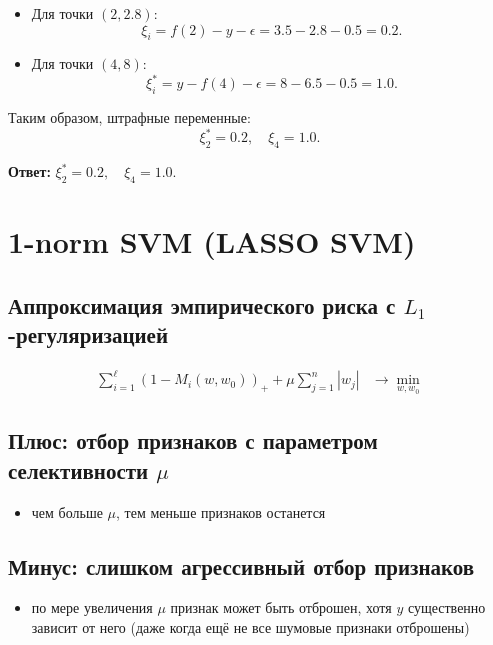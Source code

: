 \begin{enumerate}
\begin{itemize}
              \item Для точки \((2, 2.8)\):
                    \begin{equation*}
                        \xi_i = f(2) - y - \epsilon = 3.5 - 2.8 - 0.5 = 0.2.
                    \end{equation*}
              \item Для точки \((4, 8)\):
                    \begin{equation*}
                        \xi_i^* = y - f(4) - \epsilon = 8 - 6.5 - 0.5 = 1.0.
                    \end{equation*}
          \end{itemize}
          Таким образом, штрафные переменные:
          \begin{equation*}
              \xi_2^* = 0.2, \quad \xi_4 = 1.0.
          \end{equation*}
\end{enumerate}
\par \noindent \textbf{Ответ:} \(\xi_2^* = 0.2, \quad \xi_4 = 1.0.\)


\setcounter{secnumdepth}{0}

\section{1-norm SVM (LASSO SVM)}
\subsection*{Аппроксимация эмпирического риска с \(L_1\)-регуляризацией}
\begin{align*}
    \sum_{i=1}^{\ell} \left(1 - M_i(w, w_0)\right)_+ + \mu \sum_{j=1}^{n} |w_j| & \rightarrow \min_{w, w_0}
\end{align*}

\subsection*{Плюс: отбор признаков с параметром селективности \(\mu\)}
\begin{itemize}
    \item чем больше \(\mu\), тем меньше признаков останется
\end{itemize}

\subsection*{Минус: слишком агрессивный отбор признаков}
\begin{itemize}
    \item по мере увеличения \(\mu\) признак может быть отброшен, хотя $y$ существенно зависит от него (даже когда ещё не все шумовые признаки отброшены)
\end{itemize}

